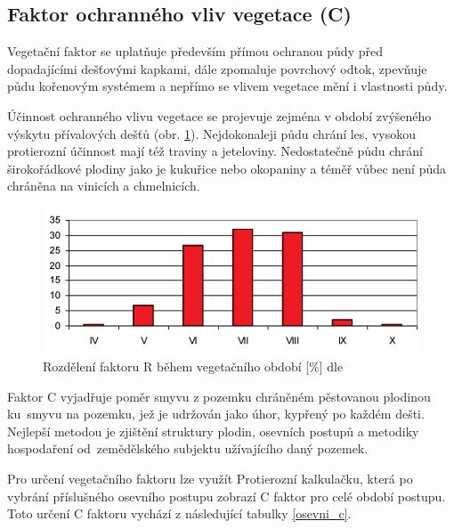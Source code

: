 \subsection{Faktor ochranného vliv vegetace (C)}
Vegetační faktor se uplatňuje především přímou ochranou půdy před
dopadajícími dešťovými kapkami, dále zpomaluje povrchový odtok,
zpevňuje půdu kořenovým systémem a nepřímo se vlivem vegetace mění i
vlastnosti půdy.

Účinnost ochranného vlivu vegetace se projevuje zejména v období
zvýšeného výskytu přívalových dešťů
(obr. \ref{fig:r_faktor_graph}). Nejdokonaleji půdu chrání les,
vysokou protierozní účinnost mají též traviny a
jeteloviny. Nedostatečně půdu chrání širokořádkové plodiny jako je
kukuřice nebo okopaniny a téměř vůbec není půda chráněna na vinicích a
chmelnicích.
\begin{figure}[H]
    \centering
    \includegraphics[scale=0.8]{./pictures/r_factor_graph.png}
      \caption[Rozdělení faktoru R během vegetačního období]{Rozdělení
        faktoru R během vegetačního období [\%] dle
        \cite{janecek2012}}
      \label{fig:r_faktor_graph}
\end{figure}
Faktor C vyjadřuje poměr smyvu z pozemku chráněném
pěstovanou plodinou ku~smyvu na pozemku, jež je udržován jako úhor,
kypřený po každém dešti. Nejlepší metodou je zjištění struktury
plodin, osevních postupů a metodiky hospodaření od~zemědělského
subjektu užívajícího daný pozemek.

Pro určení vegetačního faktoru lze využít Protierozní
kalkulačku\cite{kalkulacka}, která po vybrání příslušného osevního
postupu zobrazí C faktor pro celé období postupu. Toto určení C faktoru vychází z následující tabulky \ref{osevni_c}.


